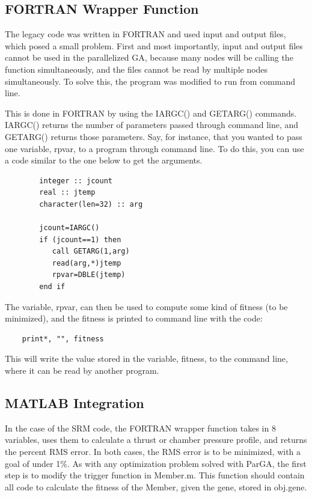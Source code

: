 \documentclass[conference]{IEEEtran}
\begin{document}
\subsection{FORTRAN Wrapper Function}

The legacy code was written in FORTRAN and used input and output files, which posed a small problem.  First and most importantly, input and output files cannot be used in the parallelized GA, because many nodes will be calling the function simultaneously, and the files cannot be read by multiple nodes simultaneously.  To solve this, the program was modified to run from command line.  

This is done in FORTRAN by using the IARGC() and GETARG() commands.  IARGC() returns the number of parameters passed through command line, and GETARG() returns those parameters.  Say, for instance, that you wanted to pass one variable, rpvar, to a program through command line.  To do this, you can use a code similar to the one below to get the arguments.

\begin{minipage}{0.43\textwidth}
\begin{lstlisting}
        integer :: jcount
        real :: jtemp
        character(len=32) :: arg
        
        jcount=IARGC()
        if (jcount==1) then
           call GETARG(1,arg)
           read(arg,*)jtemp
           rpvar=DBLE(jtemp)
        end if
\end{lstlisting}
\end{minipage}

The variable, rpvar, can then be used to compute some kind of fitness (to be minimized), and the fitness is printed to command line with the code:

\begin{minipage}{0.43\textwidth}
\begin{lstlisting}
	print*, "", fitness
\end{lstlisting}
\end{minipage}

This will write the value stored in the variable, fitness, to the command line, where it can be read by another program.  

\subsection{MATLAB Integration}

In the case of the SRM code, the FORTRAN wrapper function takes in 8 variables, uses them to calculate a thrust or chamber pressure profile, and returns the percent RMS error.  In both cases, the RMS error is to be minimized, with a goal of under 1\%.  As with any optimization problem solved with ParGA, the first step is to modify the trigger function in Member.m.  This function should contain all code to calculate the fitness of the Member, given the gene, stored in obj.gene. 
\end{document}
